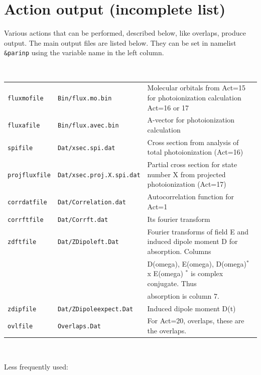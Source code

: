 \documentclass[10pt,leqno, oneside]{book}
\begin{document}
\section{Action output (incomplete list)}

Various actions that can be performed, described below, like overlaps, produce output.  The main output files are listed below.
They can be set in namelist \verb#&parinp# using the variable name in the left column.

\

{\small
\begin{tabular}{lll}
\verb#fluxmofile# & \verb#Bin/flux.mo.bin# & Molecular orbitals from Act=15 for photoionization calculation Act=16 or 17\\
\verb#fluxafile# & \verb#Bin/flux.avec.bin# & A-vector for photoionization calculation\\
\verb#spifile# & \verb#Dat/xsec.spi.dat# & Cross section from analysis of total photoionization (Act=16) \\
\verb#projfluxfile# & \verb#Dat/xsec.proj.X.spi.dat# & Partial cross section for state number X from projected photoionization (Act=17) \\
\verb#corrdatfile# &\verb#Dat/Correlation.dat# & Autocorrelation function for Act=1  \\
\verb#corrftfile# & \verb#Dat/Corrft.dat# & Its fourier transform  \\
\verb#zdftfile# & \verb#Dat/ZDipoleft.Dat# & Fourier transforms of field E and induced dipole moment D for absorption.  Columns \\
&	& D(omega), E(omega), D(omega)$^*$ x E(omega)     $^*$ is complex conjugate.   Thus  \\
&	& absorption is column 7. \\
\verb#zdipfile# & \verb#Dat/ZDipoleexpect.Dat#  & Induced dipole moment D(t) \\
\verb#ovlfile# & \verb#Overlaps.Dat#  & For Act=20, overlaps, these are the overlaps. \\
\end{tabular}
}

\

Less frequently used: 
\end{document}
